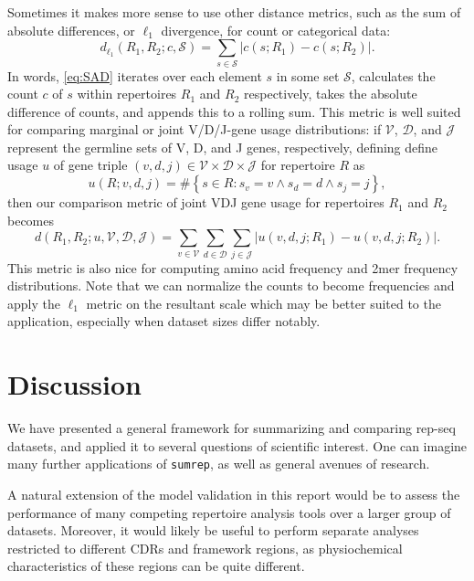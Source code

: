 \documentclass{article}
\begin{document}
Sometimes it makes more sense to use other distance metrics, such as the sum of absolute differences, or $\ell_1$ divergence, for count or categorical data:
\begin{equation}\label{eq:SAD}
    d_{\ell_1}(R_1, R_2; c, \mathcal S) = \sum_{s \in \mathcal S} \left| c(s; R_1) - c(s; R_2) \right|.
\end{equation}
In words, \eqref{eq:SAD} iterates over each element $s$ in some set $\mathcal S$, calculates the count $c$ of $s$ within repertoires $R_1$ and $R_2$ respectively, takes the absolute difference of counts, and appends this to a rolling sum.
This metric is well suited for comparing marginal or joint V/D/J-gene usage distributions:
if $\mathcal V$, $\mathcal D$, and $\mathcal J$ represent the germline sets of V, D, and J genes, respectively,
defining define usage $u$ of gene triple $(v, d, j) \in \mathcal V \times \mathcal D \times \mathcal J$ for repertoire $R$ as
\begin{equation}
u(R; v, d, j) = \#\left\{s \in R: s_v = v \land s_d = d \land s_j = j\right\},
\end{equation}
then our comparison metric of joint VDJ gene usage for repertoires $R_1$ and $R_2$ becomes
\begin{equation}
d(R_1, R_2; u, \mathcal V, \mathcal D, \mathcal J) = \sum_{v \in \mathcal V} \sum_{d \in \mathcal D} \sum_{j \in \mathcal J} \left| u(v, d, j; R_1) - u(v, d, j; R_2) \right|.
\end{equation}
This metric is also nice for computing amino acid frequency and 2mer frequency distributions.
Note that we can normalize the counts to become frequencies and apply the $\ell_1$ metric on the resultant scale which may be better suited to the application, especially when dataset sizes differ notably.


\section*{Discussion}
We have presented a general framework for summarizing and comparing rep-seq datasets, and applied it to several questions of scientific interest.
One can imagine many further applications of \texttt{sumrep}, as well as general avenues of research.

A natural extension of the model validation in this report would be to assess the performance of many competing repertoire analysis tools over a larger group of datasets.
Moreover, it would likely be useful to perform separate analyses restricted to different CDRs and framework regions, as physiochemical characteristics of these regions can be quite different.
\end{document}
